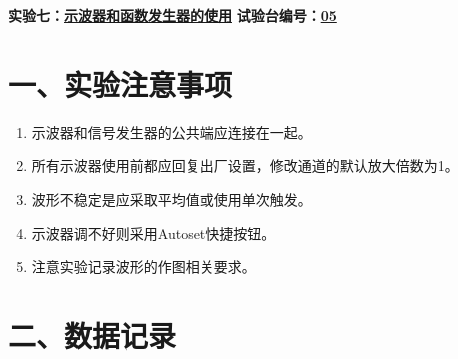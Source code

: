 \documentclass[12pt,a4paper]{article}
\begin{document}
\noindent
{\Large \textbf{实验七：}\underline{\textbf{示波器和函数发生器的使用}}} \hfill {\Large \textbf{试验台编号：}\underline{\textbf{05}}}
\vspace{0.5cm}

\section*{一、实验注意事项}
\begin{enumerate}
    \item 示波器和信号发生器的公共端应连接在一起。
    \item 所有示波器使用前都应回复出厂设置，修改通道的默认放大倍数为1。
    \item 波形不稳定是应采取平均值或使用单次触发。
    \item 示波器调不好则采用Autoset快捷按钮。
    \item 注意实验记录波形的作图相关要求。
\end{enumerate}


\section*{二、数据记录}

\renewcommand{\arraystretch}{2.0}
\end{document}
